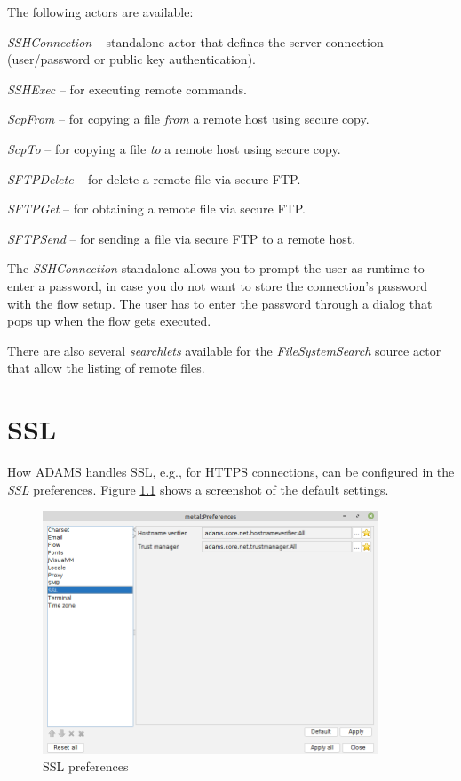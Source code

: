 \documentclass[a4paper]{book}
\begin{document}
The following actors are available:
\begin{tight_itemize}
	\item \textit{SSHConnection} -- standalone actor that defines the server
	connection (user/password or public key authentication).
	\item \textit{SSHExec} -- for executing remote commands.
	\item \textit{ScpFrom} -- for copying a file \textit{from} a remote host using
	secure copy.
	\item \textit{ScpTo} -- for copying a file \textit{to} a remote host using
	secure copy.
	\item \textit{SFTPDelete} -- for delete a remote file via secure FTP.
	\item \textit{SFTPGet} -- for obtaining a remote file via secure FTP.
	\item \textit{SFTPSend} -- for sending a file via secure FTP to a remote host.
\end{tight_itemize}
The \textit{SSHConnection} standalone allows you to prompt the user as runtime
to enter a password, in case you do not want to store the connection's password
with the flow setup. The user has to enter the password through a dialog that
pops up when the flow gets executed.

There are also several \textit{searchlets} available for the
\textit{FileSystemSearch} source actor that allow the listing of remote
files.


\chapter{SSL}
How ADAMS handles SSL, e.g., for HTTPS connections, can be configured in the
\textit{SSL} preferences. Figure \ref{ssl_setup} shows a screenshot of the
default settings.

\begin{figure}[htb]
  \centering
  \includegraphics[width=10.0cm]{images/ssl_setup.png}
  \caption{SSL preferences}
  \label{ssl_setup}
\end{figure}
\end{document}
